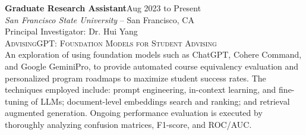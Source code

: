 \documentclass[hidelinks, 10pt]{article}
\begin{document}
{{\hrulefill

\vspace{4mm}

\begin{minipage}[ct]{0.9\linewidth}
\textbf{Graduate Research Assistant}\hfill Aug 2023 to Present\\
\emph{San Francisco State University} -- San Francisco, CA\\
Principal Investigator: Dr. Hui Yang\\
{\textsc{AdvisingGPT: Foundation Models for Student Advising}}
\vspace{1mm}\\
An exploration of using foundation models such as ChatGPT, Cohere Command, and Google
GeminiPro, to provide automated course equivalency evaluation and personalized
program roadmaps to maximize student success rates. The techniques employed
include: prompt engineering, in-context learning, and fine-tuning of LLMs;
document-level embeddings search and ranking; and retrieval augmented
generation.  Ongoing performance evaluation is executed by thoroughly analyzing
confusion matrices, F1-score, and ROC/AUC.
\end{minipage}

\vspace{4mm}

}}
\end{document}
